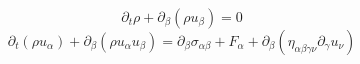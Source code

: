 \documentclass[12pt]{article}
\begin{document}
$$ 
\partial_t \rho + \partial_{\beta}\left(\rho u_{\beta}\right)= 0
$$
$$
\partial_t\left(\rho u_{\alpha}\right) + \partial_{\beta}\left(\rho u_{\alpha} u_{\beta}\right) = \partial_{\beta}\sigma_{\alpha \beta} + F_{\alpha} + \partial_{\beta}\left(\eta_{\alpha \beta \gamma \nu}\partial_{\gamma} u_{\nu}\right)
$$
\end{document}
